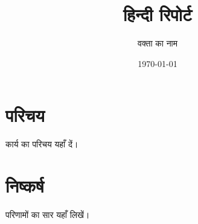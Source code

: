 \documentclass[12pt]{report}
\title{हिन्दी रिपोर्ट}
\author{वक्ता का नाम}
\date{\today}
\begin{document}
\maketitle
\tableofcontents

\chapter{परिचय}
कार्य का परिचय यहाँ दें।

\chapter{निष्कर्ष}
परिणामों का सार यहाँ लिखें।

% 
\end{document}
